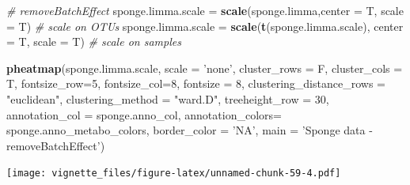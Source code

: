 \documentclass[]{book}
\newenvironment{Shaded}{\begin{snugshade}}{\end{snugshade}}
\newcommand{\KeywordTok}[1]{\textcolor[rgb]{0.13,0.29,0.53}{\textbf{#1}}}
\newcommand{\DataTypeTok}[1]{\textcolor[rgb]{0.13,0.29,0.53}{#1}}
\newcommand{\DecValTok}[1]{\textcolor[rgb]{0.00,0.00,0.81}{#1}}
\newcommand{\StringTok}[1]{\textcolor[rgb]{0.31,0.60,0.02}{#1}}
\newcommand{\CommentTok}[1]{\textcolor[rgb]{0.56,0.35,0.01}{\textit{#1}}}
\newcommand{\NormalTok}[1]{#1}
\begin{document}
\begin{Shaded}
\begin{Highlighting}[]
\CommentTok{# removeBatchEffect}
\NormalTok{sponge.limma.scale =}\StringTok{ }\KeywordTok{scale}\NormalTok{(sponge.limma,}\DataTypeTok{center =}\NormalTok{ T, }\DataTypeTok{scale =}\NormalTok{ T) }\CommentTok{# scale on OTUs}
\NormalTok{sponge.limma.scale =}\StringTok{ }\KeywordTok{scale}\NormalTok{(}\KeywordTok{t}\NormalTok{(sponge.limma.scale), }\DataTypeTok{center =}\NormalTok{ T, }\DataTypeTok{scale =}\NormalTok{ T) }\CommentTok{# scale on samples}

\KeywordTok{pheatmap}\NormalTok{(sponge.limma.scale, }
         \DataTypeTok{scale =} \StringTok{'none'}\NormalTok{, }
         \DataTypeTok{cluster_rows =}\NormalTok{ F, }
         \DataTypeTok{cluster_cols =}\NormalTok{ T, }
         \DataTypeTok{fontsize_row=}\DecValTok{5}\NormalTok{, }\DataTypeTok{fontsize_col=}\DecValTok{8}\NormalTok{,}
         \DataTypeTok{fontsize =} \DecValTok{8}\NormalTok{,}
         \DataTypeTok{clustering_distance_rows =} \StringTok{"euclidean"}\NormalTok{,}
         \DataTypeTok{clustering_method =} \StringTok{"ward.D"}\NormalTok{,}
         \DataTypeTok{treeheight_row =} \DecValTok{30}\NormalTok{,}
         \DataTypeTok{annotation_col =}\NormalTok{ sponge.anno_col,}
         \DataTypeTok{annotation_colors=}\NormalTok{ sponge.anno_metabo_colors,}
         \DataTypeTok{border_color =} \StringTok{'NA'}\NormalTok{,}
         \DataTypeTok{main =} \StringTok{'Sponge data - removeBatchEffect'}\NormalTok{)}
\end{Highlighting}
\end{Shaded}

\texttt{[image: vignette\_files/figure-latex/unnamed-chunk-59-4.pdf]}
\end{document}
